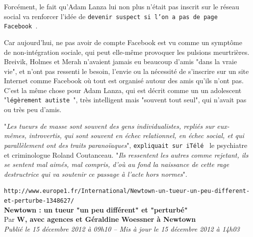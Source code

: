 \documentclass[11pt,twoside,a4paper]{article}
\begin{document}
Forc{\'e}ment, le fait qu'Adam Lanza lui non plus n'{\'e}tait pas inscrit sur le r{\'e}seau social va renforcer l'id{\'e}e de \texttt{devenir suspect si l'on a pas de page Facebook~\footnotemark}. ~\\

Car aujourd'hui, ne pas avoir de compte Facebook est vu comme un sympt{\^o}me de non-int{\'e}gration sociale, qui peut elle-m{\^e}me provoquer les pulsions meurtri{\`e}res. Breivik, Holmes et Merah n'avaient jamais eu beaucoup d'amis "dans la vraie vie", et n'ont pas ressenti le besoin, l'envie ou la n{\'e}cessit{\'e} de s'inscrire sur un site Internet comme Facebook o{\`u} tout est organis{\'e} autour des amis qu'ils n'ont pas. C'est la m{\^e}me chose pour Adam Lanza, qui est d{\'e}crit comme un un adolescent "\texttt{l{\'e}g{\`e}rement autiste~\footnotemark}", tr{\`e}s intelligent mais "souvent tout seul", qui n'avait pas ou tr{\`e}s peu d'amis. ~\\

"\emph{Les tueurs de masse sont souvent des gens individualistes, repli{\'e}s sur eux-m{\^e}mes, introvertis, qui sont souvent en {\'e}chec relationnel, en {\'e}chec social, et qui parall{\`e}lement ont des traits parano{\"i}aques}", \texttt{expliquait sur iT{\'e}l{\'e}~\footnotemark} le psychiatre et criminologue Roland Coutanceau. "\emph{Ils ressentent les autres comme rejetant, ils se sentent mal aim{\'e}s, mal compris, d'o{\`u} au fond la naissance de cette rage destructrice qui va soutenir ce passage {\`a} l'acte hors normes}". ~\\

\clearpage

\texttt{http://www.europe1.fr/International/Newtown-un-tueur-un-peu-different-et-perturbe-1348627/}~\\

\textbf{\LARGE Newtown : un tueur "un peu diff{\'e}rent" et "perturb{\'e}"}~\\

Par \textbf{W, avec agences et G{\'e}raldine Woessner {\`a} Newtown}~\\

\emph{Publi{\'e} le 15 d{\'e}cembre 2012 {\`a} 09h10 -- Mis {\`a} jour le 15 d{\'e}cembre 2012 {\`a} 14h03}~\\
\end{document}
